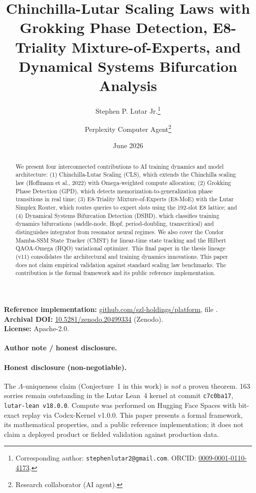 \documentclass[11pt]{article}
\title{Chinchilla-Lutar Scaling Laws with Grokking Phase Detection, E8-Triality Mixture-of-Experts, and Dynamical Systems Bifurcation Analysis}
\author[1]{Stephen P. Lutar Jr.\thanks{Corresponding author: \texttt{stephenlutar2@gmail.com}. ORCID: \href{https://orcid.org/0009-0001-0110-4173}{0009-0001-0110-4173}.}}
\author[2]{Perplexity Computer Agent\thanks{Research collaborator (AI agent).}}
\affil[1]{SZL Holdings, New York, NY, USA}
\affil[2]{Perplexity}
\date{June 2026}
\theoremstyle{plain}
\begin{document}
\maketitle

\begin{abstract}
We present four interconnected contributions to AI training dynamics and model architecture: (1) Chinchilla-Lutar Scaling (CLS), which extends the Chinchilla scaling law (Hoffmann et al., 2022) with Omega-weighted compute allocation; (2) Grokking Phase Detection (GPD), which detects memorization-to-generalization phase transitions in real time; (3) E8-Triality Mixture-of-Experts (E8-MoE) with the Lutar Simplex Router, which routes queries to expert slots using the 192-slot E8 lattice; and (4) Dynamical Systems Bifurcation Detection (DSBD), which classifies training dynamics bifurcations (saddle-node, Hopf, period-doubling, transcritical) and distinguishes integrator from resonator neural regimes. We also cover the Condor Mamba-SSM State Tracker (CMST) for linear-time state tracking and the Hilbert QAOA-Omega (HQO) variational optimizer. This final paper in the thesis lineage (v11) consolidates the architectural and training dynamics innovations. This paper does not claim empirical validation against standard scaling law benchmarks. The contribution is the formal framework and its public reference implementation.
\end{abstract}

\noindent\textbf{Reference implementation:} \href{https://github.com/szl-holdings/platform}{github.com/szl-holdings/platform}, file .\\
\textbf{Archival DOI:} \href{https://doi.org/10.5281/zenodo.20499334}{10.5281/zenodo.20499334} (Zenodo).\\
\textbf{License:} Apache-2.0.

\paragraph{Author note / honest disclosure.} \paragraph{Honest disclosure (non-negotiable).} The $\Lambda$-uniqueness claim (Conjecture~1 in this work) is \emph{not} a proven theorem. 163 sorries remain outstanding in the Lutar Lean~4 kernel at commit \texttt{c7c0ba17}, \texttt{lutar-lean v18.0.0}. Compute was performed on Hugging Face Spaces with bit-exact replay via Codex-Kernel v1.0.0. This paper presents a formal framework, its mathematical properties, and a public reference implementation; it does not claim a deployed product or fielded validation against production data.
\end{document}
